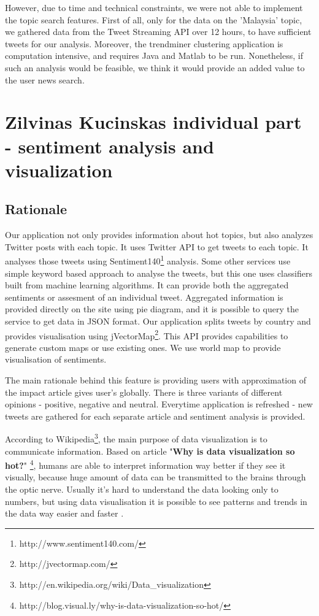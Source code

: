 \documentclass{acm_proc_10ptArticle-sp}
\begin{document}
However, due to time and technical constraints, we were not able to implement the topic search features. First of all, only for the data on the 'Malaysia' topic, we gathered data from the Tweet Streaming API over 12 hours, to have sufficient tweets for our analysis. Moreover, the trendminer clustering application is computation intensive, and requires Java and Matlab to be run. Nonetheless, if such an analysis would be feasible, we think it would provide an added value to the user news search.

\section{Zilvinas Kucinskas individual part - sentiment analysis and visualization}

\subsection{Rationale}

Our application not only provides information about hot topics, but also analyzes Twitter posts with each topic. It uses Twitter API to get tweets to each topic. It analyses those tweets using Sentiment140\footnote{http://www.sentiment140.com/} analysis. Some other services use simple keyword based approach to analyse the tweets, but this one uses classifiers built from machine learning algorithms. It can provide both the aggregated sentiments or assesment of an individual tweet. Aggregated information is provided directly on the site using pie diagram, and it is possible to query the service to get data in JSON format. Our application splits tweets by country and provides visualisation using jVectorMap\footnote{http://jvectormap.com/}. This API provides capabilities to generate custom maps or use existing ones. We use world map to provide visualisation of sentiments.

The main rationale behind this feature is providing users with approximation of the impact article gives user's globally. There is three variants of different opinions - positive, negative and neutral. Everytime application is refreshed - new tweets are gathered for each separate article and sentiment analysis is provided. 

According to Wikipedia\footnote{http://en.wikipedia.org/wiki/Data\_visualization}, the main purpose of data visualization is to communicate information. Based on article "\textbf{Why is data visualization so hot?}" \footnote{http://blog.visual.ly/why-is-data-visualization-so-hot/}, humans are able to interpret information way better if they see it visually, because huge amount of data can be transmitted to the brains through the optic nerve. Usually it's hard to understand the data looking only to numbers, but using data visualisation it is possible to see patterns and trends in the data way easier and faster \cite{kaidi}.
\end{document}
